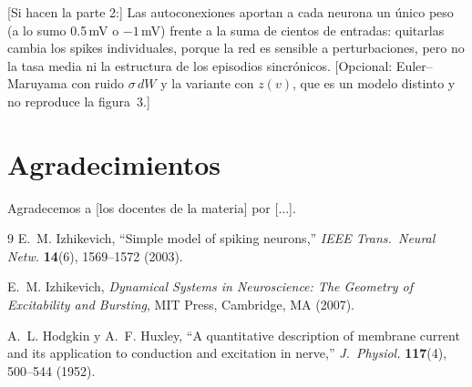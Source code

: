 \documentclass[10pt,a4paper,twocolumn]{article}
\begin{document}
[Si hacen la parte 2:] Las autoconexiones aportan a cada neurona un único peso
(a lo sumo \num{0.5}\,mV o $-1$\,mV) frente a la suma de cientos de entradas:
quitarlas cambia los spikes individuales, porque la red es sensible a
perturbaciones, pero no la tasa media ni la estructura de los episodios
sincrónicos. [Opcional: Euler--Maruyama con ruido $\sigma\,dW$ y la variante con
$z(v)$, que es un modelo distinto y no reproduce la figura~3.] %

\section*{Agradecimientos}
Agradecemos a [los docentes de la materia] por [...].

\begin{thebibliography}{9}\small
{}
  E.~M. Izhikevich, ``Simple model of spiking neurons,''
  \emph{IEEE Trans.\ Neural Netw.} \textbf{14}(6), 1569--1572 (2003).

  E.~M. Izhikevich, \emph{Dynamical Systems in Neuroscience: The Geometry of
  Excitability and Bursting}, MIT Press, Cambridge, MA (2007).

  A.~L. Hodgkin y A.~F. Huxley, ``A quantitative description of membrane
  current and its application to conduction and excitation in nerve,''
  \emph{J.\ Physiol.} \textbf{117}(4), 500--544 (1952).
\end{thebibliography}
\end{document}
